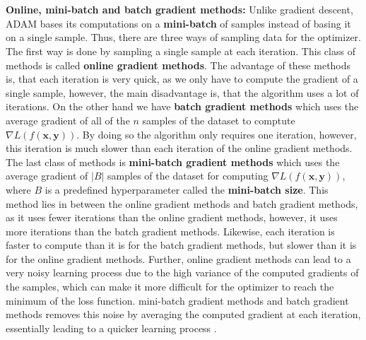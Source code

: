 \documentclass[./main.tex]{subfiles}
\begin{document}
\\
\\
\noindent \textbf{Online, mini-batch and batch gradient methods:} Unlike gradient descent, ADAM bases its computations on a \textbf{mini-batch} of samples instead of basing it on a single sample. Thus, there are three ways of sampling data for the optimizer. The first way is done by sampling a single sample at each iteration. This class of methods is called \textbf{online gradient methods}. The advantage of these methods is, that each iteration is very quick, as we only have to compute the gradient of a single sample, however, the main disadvantage is, that the algorithm uses a lot of iterations. On the other hand we have \textbf{batch gradient methods} which uses the average gradient of all of the $n$ samples of the dataset to comptute $\nabla L(f(\bm{x}, \bm{y}))$. By doing so the algorithm only requires one iteration, however, this iteration is much slower than each iteration of the online gradient methods. The last class of methods is \textbf{mini-batch gradient methods} which uses the average gradient of $|B|$ samples of the dataset for computing $\nabla L(f(\bm{x}, \bm{y}))$, where $B$ is a predefined hyperparameter called the \textbf{mini-batch size}. This method lies in between the online gradient methods and batch gradient methods, as it uses fewer iterations than the online gradient methods, however, it uses more iterations than the batch gradient methods. Likewise, each iteration is faster to compute than it is for the batch gradient methods, but slower than it is for the online gradient methods. Further, online gradient methods can lead to a very noisy learning process due to the high variance of the computed gradients of the samples, which can make it more difficult for the optimizer to reach the minimum of the loss function. mini-batch gradient methods and batch gradient methods removes this noise by averaging the computed gradient at each iteration, essentially leading to a quicker learning process \cite{DL_book}. 
\\
\\
\end{document}
